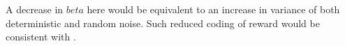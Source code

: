 \documentclass[12pt]{article}
\begin{document}
	
	A decrease in $beta$ here would be equivalent to an increase in variance of both deterministic and random noise. Such reduced coding of reward would be consistent with \cite{ebitz17}.  
	
	
	
	
	

	
	
	
	
	\cleardoublepage
	\ifdefined{}
	\else
	\fi
	
\end{document}

